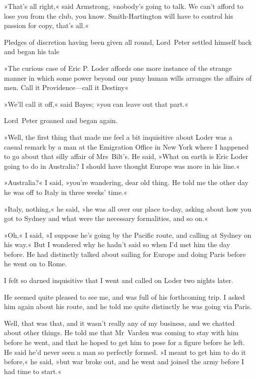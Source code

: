 »That's all right,« said Armstrong, »nobody's going to talk. We can't afford to lose you from the club, you know. Smith-Hartington will have to control his passion for copy, that's all.«

Pledges of discretion having been given all round, Lord~Peter settled himself back and began his tale

\divider

»The curious case of Eric P\@. Loder affords one more instance of the strange manner in which some power beyond our puny human wills arranges the affairs of men. Call it Providence—call it Destiny\longdash«

»We'll call it off,« said Bayes; »you can leave out that part.«

Lord~Peter groaned and began again.

»Well, the first thing that made me feel a bit inquisitive about Loder was a casual remark by a man at the Emigration Office in New York where I happened to go about that silly affair of Mrs~Bilt's. He said, »What on earth is Eric Loder going to do in Australia? I should have thought Europe was more in his line.«

»Australia?« I said, »you're wandering, dear old thing. He told me the other day he was off to Italy in three weeks' time.«

»Italy, nothing,« he said, »he was all over our place to-day, asking about how you got to Sydney and what were the necessary formalities, and so on.«

»Oh,« I said, »I suppose he's going by the Pacific route, and calling at Sydney on his way.« But I wondered why he hadn't said so when I'd met him the day before. He had distinctly talked about sailing for Europe and doing Paris before he went on to Rome.

I felt so darned inquisitive that I went and called on Loder two nights later.

He seemed quite pleased to see me, and was full of his forthcoming trip. I asked him again about his route, and he told me quite distinctly he was going via Paris.

Well, that was that, and it wasn't really any of my business, and we chatted about other things. He told me that Mr~Varden was coming to stay with him before he went, and that he hoped to get him to pose for a figure before he left. He said he'd never seen a man so perfectly formed. »I meant to get him to do it before,« he said, »but war broke out, and he went and joined the army before I had time to start.«

